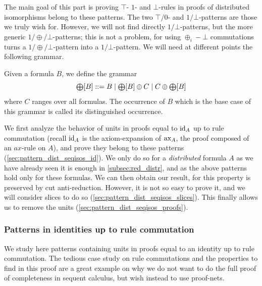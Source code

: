 \documentclass{lmcs}
\newcommand*{\pcontext}[1]{\resizebox{!}{7pt}{$\bigoplus$}[#1]}
\newcommand*{\id}[1]{\ensuremath{\textnormal{id}_{#1}}}
\newcommand*{\ax}[1]{\ensuremath{\textnormal{ax}_{#1}}}
\newcommand{\coloncoloneqq}{\mathrel{::=}}
\begin{document}
The main goal of this part is proving $\top$- $1$- and $\bot$-rules in proofs of distributed isomorphisms belong to these patterns.
The two $\top/0$- and $1/\bot$-patterns are those we truly wish for.
However, we will not find directly $1/\bot$-patterns, but the more generic $1/\oplus/\bot$-patterns; this is not a problem, for using $\oplus_i-\bot$ commutations turns a $1/\oplus/\bot$-pattern into a $1/\bot$-pattern.
We will need at different points the following grammar.

\begin{defi}
\label{def:oplus_grammar}
Given a formula $B$, we define the grammar
\begin{equation*}
\pcontext{B} \coloncoloneqq B \mid \pcontext{B}\oplus C \mid C\oplus \pcontext{B}
\end{equation*}
where $C$ ranges over all formulas.
The occurrence of $B$ which is the base case of this grammar is called its distinguished occurrence.
\end{defi}

We first analyze the behavior of units in proofs equal to $\id{A}$ up to rule commutation (recall $\id{A}$ is the axiom-expansion of $\ax{A}$, the proof composed of an $ax$-rule on $A$), and prove they belong to these patterns (\autoref{sec:pattern_dist_seqisos_id}).
We only do so for a \emph{distributed} formula $A$ as we have already seen it is enough in \autoref{subsec:red_distr}, and as the above patterns hold only for these formulas.
We can then obtain our result, for this property is preserved by cut anti-reduction.
However, it is not so easy to prove it, and we will consider slices to do so (\autoref{sec:pattern_dist_seqisos_slices}).
This finally allows us to remove the units (\autoref{sec:pattern_dist_seqisos_proofs}).

\subsubsection{Patterns in identities up to rule commutation}
\label{sec:pattern_dist_seqisos_id}

We study here patterns containing units in proofs equal to an identity up to rule commutation.
The tedious case study on rule commutations and the properties to find in this proof are a great example on why we do not want to do the full proof of completeness in sequent calculus, but wish instead to use proof-nets.
\end{document}
